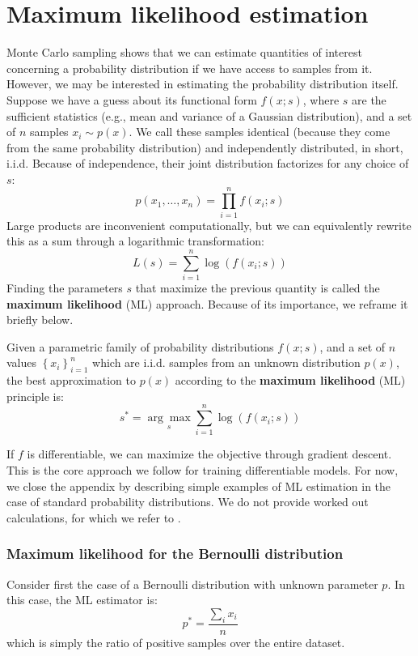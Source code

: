 \section{Maximum likelihood estimation} \addclock
\label{sec:maximum_likelihood_estimation}

Monte Carlo sampling shows that we can estimate quantities of interest concerning a probability distribution if we have access to samples from it. However, we may be interested in estimating the probability distribution itself. Suppose we have a guess about its functional form $f(x; s)$, where $s$ are the sufficient statistics (e.g., mean and variance of a Gaussian distribution), and a set of $n$ samples $x_i \sim p(x)$. We call these samples identical (because they come from the same probability distribution) and independently distributed, in short, i.i.d. Because of independence, their joint distribution factorizes for any choice of $s$:
%
$$
p(x_1, \ldots, x_n)=\prod_{i=1}^n f(x_i; s)
$$
%
Large products are inconvenient computationally, but we can equivalently rewrite this as a sum through a logarithmic transformation:
%
$$
L(s)= \sum_{i=1}^n\log(f(x_i;s))
$$
%
Finding the parameters $s$ that maximize the previous quantity is called the \textbf{maximum likelihood} (ML) approach. Because of its importance, we reframe it briefly below.

\newpage
\begin{definition} \addbottle
Given a parametric family of probability distributions $f(x; s)$, and a set of $n$ values $\left\{x_i\right\}_{i=1}^n$ which are i.i.d. samples from an unknown distribution $p(x)$, the best approximation to $p(x)$ according to the \textbf{maximum likelihood} (ML) principle is:
%
$$
s^*=\underset{s}{\arg\max} \sum_{i=1}^n \log(f(x_i;s))
$$
\end{definition}

If $f$ is differentiable, we can maximize the objective through gradient descent. This is the core approach we follow for training differentiable models. For now, we close the appendix by describing simple examples of ML estimation in the case of standard probability distributions. We do not provide worked out calculations, for which we refer to \cite{bishop2006pattern,bishop2024deep}.
%
\subsubsection*{Maximum likelihood for the Bernoulli distribution}
%
Consider first the case of a Bernoulli distribution with unknown parameter $p$. In this case, the ML estimator is:
%
$$
p^*=\frac{\sum_i x_i}{n}
$$
%
which is simply the ratio of positive samples over the entire dataset.

